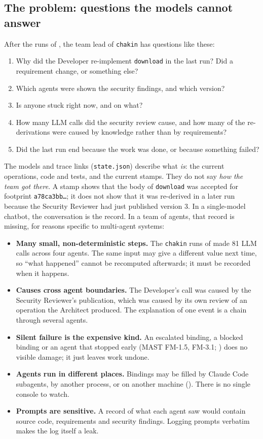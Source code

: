 \documentclass[10pt,a4paper]{article}
\newcommand{\code}[1]{\texttt{#1}}
\newcommand{\file}[1]{\texttt{#1}}
\theoremstyle{definition}
\begin{document}
\subsection{The problem: questions the models cannot answer}\label{sec:obs-why}

After the runs of , the team lead of \texttt{chakin} has
questions like these:
\begin{enumerate}[nosep, label=Q\arabic*.]
\item Why did the Developer re-implement \code{download} in the last run?
Did a requirement change, or something else?
\item Which agents were shown the security findings, and which version?
\item Is anyone stuck right now, and on what?
\item How many LLM calls did the security review cause, and how many of the
re-derivations were caused by knowledge rather than by requirements?
\item Did the last run end because the work was done, or because something
failed?
\end{enumerate}

\noindent The models and trace links (\file{state.json}) describe what
\emph{is}: the current operations, code and tests, and the current stamps.
They do not say \emph{how the team got there}. A stamp shows that the body of
\code{download} was accepted for footprint \code{a78ca3bb\ldots}; it does not
show that it was re-derived in a later run because the Security Reviewer had
just published version 3. In a single-model chatbot, the conversation is
the record. In a team of agents, that record is missing, for reasons specific
to multi-agent systems:

\begin{itemize}[nosep]
\item \textbf{Many small, non-deterministic steps.} The \texttt{chakin} runs
of  made 81 LLM calls across four agents. The same input
may give a different value next time, so ``what happened'' cannot be
recomputed afterwards; it must be recorded when it happens.
\item \textbf{Causes cross agent boundaries.} The Developer's call was
caused by the Security Reviewer's publication, which was caused by its own
review of an operation the Architect produced. The explanation of one event
is a chain through several agents.
\item \textbf{Silent failure is the expensive kind.} An escalated binding, a
blocked binding or an agent that stopped early (MAST FM-1.5, FM-3.1;
) does no visible damage; it just leaves work undone.
\item \textbf{Agents run in different places.} Bindings may be filled by
Claude Code subagents, by another process, or on another machine
(). There is no single console to watch.
\item \textbf{Prompts are sensitive.} A record of what each agent saw would
contain source code, requirements and security findings. Logging prompts
verbatim makes the log itself a leak.
\end{itemize}
\end{document}
